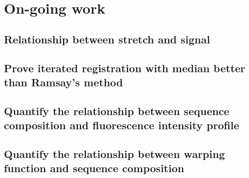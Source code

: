 \chapter{On-going work}

\section{Relationship between stretch and signal}

\section{Prove iterated registration with median better than Ramsay's method}

\section{Quantify the relationship between sequence composition and fluorescence intensity profile}

\section{Quantify the relationship between warping function and sequence composition}


